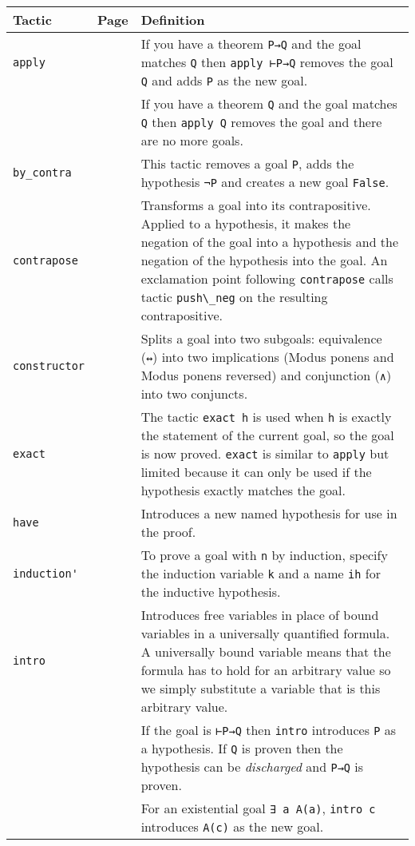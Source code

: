 \begin{tabular}{p{}|r|p{}}
\hline
Tactic & Page & Definition\\
\hline
\Verb+apply+&\pageref{p.apply}&If you have a theorem \Verb+P→Q+ and the goal matches \Verb+Q+ then \Verb+apply ⊢P→Q+ removes the goal \Verb+Q+ and adds \Verb+P+ as the new goal.\\
&&If you have a theorem \Verb+Q+ and the goal matches \Verb+Q+ then \Verb+apply Q+ removes the goal and there are no more goals.\\\hline

\Verb+by_contra+&\pageref{p.by-contra}&This tactic removes a goal \Verb+P+, adds the hypothesis \Verb+¬P+ and creates a new goal \Verb+False+.\\\hline

\Verb+contrapose+&\pageref{p.contrapose}&Transforms a goal into its contrapositive. Applied to a hypothesis, it makes the negation of the goal into a hypothesis and the negation of the hypothesis into the goal. 
An exclamation point following \Verb+contrapose+ calls tactic \Verb+push\_neg+ on the resulting contrapositive.\\\hline

\Verb+constructor+&\pageref{p.constructor}&Splits a goal into two subgoals: equivalence (\Verb+↔+) into two implications (Modus ponens and Modus ponens reversed) and conjunction (\Verb+∧+) into two conjuncts.\\\hline

\Verb+exact+&\pageref{p.exact}&The tactic \Verb+exact h+ is used when \Verb+h+ is exactly the statement of the current goal, so the goal is now proved. \Verb+exact+ is similar to \Verb+apply+ but limited because it can only be used if the hypothesis exactly matches the goal.\\\hline

\Verb+have+&\pageref{p.have}&Introduces a new named hypothesis for use in the proof.\\\hline

\Verb+induction'+&\pageref{p.induction}&To prove a goal with \Verb+n+ by induction, specify the induction variable \Verb+k+ and a name \Verb+ih+ for the inductive hypothesis.\\\hline

\Verb+intro+&\pageref{p.intro}&Introduces free variables in place of bound variables in a universally quantified formula. A universally bound variable means that the formula has to hold for an arbitrary value so we simply substitute a variable that is this arbitrary value.\\
&&If the goal is \Verb+⊢P→Q+ then \Verb+intro+ introduces \Verb+P+ as a hypothesis. If \Verb+Q+ is proven then the hypothesis can be \emph{discharged} and \Verb+P→Q+ is proven.\\
&&For an existential goal \Verb+∃ a A(a)+, \Verb+intro c+ introduces \Verb+A(c)+ as the new goal.\\\hline


\end{tabular}

